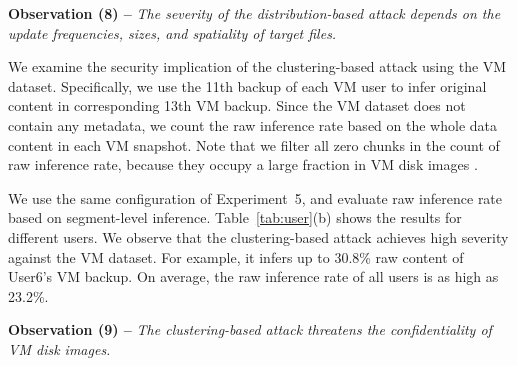 {\bf Observation (8) --} {\em The severity of the distribution-based attack depends on the update frequencies, sizes, and spatiality of target files. } 

We examine the security implication of the clustering-based attack using the VM dataset. Specifically, we use the 11th  backup of each VM user  to infer original content in corresponding 13th VM backup. Since the VM dataset does not contain any metadata, we count the raw inference rate based on the  whole data content in each VM snapshot. Note that we filter all zero chunks in the count of raw inference rate, because they occupy a large fraction in VM disk images \cite{jin09}.           



We use the same configuration of Experiment~5, and evaluate raw inference rate
based on segment-level inference.  Table~\ref{tab:user}(b) shows the results
for different users.  We observe that the clustering-based attack achieves high
severity against the VM dataset. For example, it infers up to 30.8\% raw
content of User6's VM backup. On average, the raw inference rate of all users
is as high as 23.2\%.  

{\bf Observation (9) --} {\em The clustering-based attack threatens the
confidentiality of VM disk images. } 


